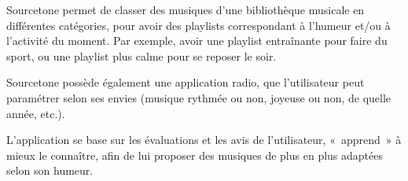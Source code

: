 Sourcetone permet de classer des musiques d'une bibliothèque musicale en
différentes catégories, pour avoir des playlists correspondant à l'humeur et/ou
à l'activité du moment. Par exemple, avoir une playlist entraînante pour faire
du sport, ou une playlist plus calme pour se reposer le soir.

Sourcetone possède également une application radio, que l'utilisateur peut
paramétrer selon ses envies (musique rythmée ou non, joyeuse ou non, de quelle
année, etc.).

L'application se base sur les évaluations et les avis de l'utilisateur,
«~apprend~» à mieux le connaître, afin de lui proposer des musiques de plus en
plus adaptées selon son humeur.

